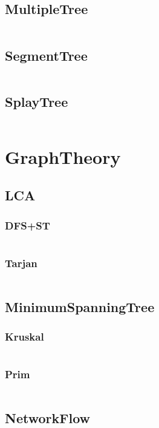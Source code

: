 \documentclass[a4paper,11pt]{article}
\begin{document}
\subsection{MultipleTree}
\inputminted[breaklines]{c++}{03++DataStructure/+MultipleTree.cpp}
\subsection{SegmentTree}
\inputminted[breaklines]{c++}{03++DataStructure/+SegmentTree.cpp}
\subsection{SplayTree}
\inputminted[breaklines]{c++}{03++DataStructure/+SplayTree.cpp}

\newpage
\section{GraphTheory}
\subsection{LCA}
\subsubsection{DFS+ST}
\inputminted[breaklines]{c++}{04++GraphTheory/+LCA/+DFS+ST.cpp}
\subsubsection{Tarjan}
\inputminted[breaklines]{c++}{04++GraphTheory/+LCA/+Tarjan.cpp}

\subsection{MinimumSpanningTree}
\subsubsection{Kruskal}
\inputminted[breaklines]{c++}{04++GraphTheory/+MinimumSpanningTree/+Kruskal.cpp}
\subsubsection{Prim}
\inputminted[breaklines]{c++}{04++GraphTheory/+MinimumSpanningTree/+Prim.cpp}

\subsection{NetworkFlow}
\end{document}
